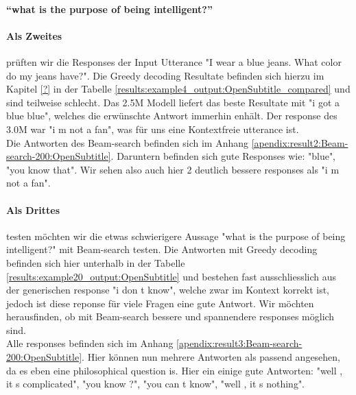 \paragraph{``what is the purpose of being intelligent?''} \blindtext

\paragraph{Als Zweites} prüften wir die Responses der Input Utterance "I wear a blue jeans. What color do my jeans have?". Die Greedy decoding Resultate befinden sich hierzu im Kapitel \ref{?} in der Tabelle \ref{results:example4_output:OpenSubtitle_compared} und sind teilweise schlecht. Das 2.5M Modell liefert das beste Resultate mit "i got a blue blue", welches die erwünschte Antwort immerhin enhält. Der response des 3.0M war "i m not a fan", was für uns eine Kontextfreie utterance ist.\\

Die Antworten des Beam-search befinden sich im Anhang \ref{apendix:result2:Beam-search-200:OpenSubtitle}. Daruntern befinden sich gute Responses wie: "blue", "you know that". Wir sehen also auch hier 2 deutlich bessere responses als "i m not a fan".

\paragraph{Als Drittes} testen möchten wir die etwas schwierigere Aussage "what is the purpose of being intelligent?" mit Beam-search testen.
Die Antworten mit Greedy decoding befinden sich hier unterhalb in der Tabelle \ref{results:example20_output:OpenSubtitle} und bestehen fast ausschliesslich aus der generischen response "i don t know", welche zwar im Kontext korrekt ist, jedoch ist diese reponse für viele Fragen eine gute Antwort. 
Wir möchten herausfinden, ob mit Beam-search bessere und spannendere responses möglich sind.\\

Alle responses befinden sich im Anhang \ref{apendix:result3:Beam-search-200:OpenSubtitle}. Hier können nun mehrere Antworten als passend angesehen, da es eben eine philosophical question is. Hier ein einige gute Antworten:  "well , it s complicated", "you know ?", "you can t know", "well , it s nothing".

